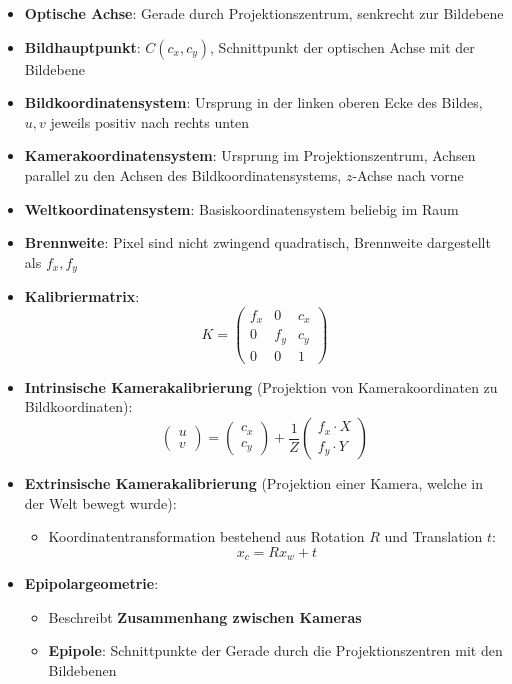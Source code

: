 \begin{itemize}
	\item \textbf{Optische Achse}: Gerade durch Projektionszentrum, senkrecht zur Bildebene
	\item \textbf{Bildhauptpunkt}: $C(c_x, c_y)$, Schnittpunkt der optischen Achse mit der Bildebene
	\item \textbf{Bildkoordinatensystem}: Ursprung in der linken oberen Ecke des Bildes, $u, v$ jeweils positiv nach rechts unten
	\item \textbf{Kamerakoordinatensystem}: Ursprung im Projektionszentrum, Achsen parallel zu den Achsen des Bildkoordinatensystems, $z$-Achse nach vorne
	\item \textbf{Weltkoordinatensystem}: Basiskoordinatensystem beliebig im Raum
	\item \textbf{Brennweite}: Pixel sind nicht zwingend quadratisch, Brennweite dargestellt als $f_x, f_y$
	\item \textbf{Kalibriermatrix}:
	$$
		K = \begin{pmatrix}
			f_x & 0 & c_x \\ 0 & f_y & c_y \\ 0 & 0 & 1
		\end{pmatrix}
	$$
	\item \textbf{Intrinsische Kamerakalibrierung} (Projektion von Kamerakoordinaten zu Bildkoordinaten):
	$$
		\begin{pmatrix}u\\v\end{pmatrix} = \begin{pmatrix}c_x\\c_y\end{pmatrix} + \frac{1}{Z}\begin{pmatrix}f_x \cdot X\\f_y \cdot Y\end{pmatrix}
	$$
	\item \textbf{Extrinsische Kamerakalibrierung} (Projektion einer Kamera, welche in der Welt bewegt wurde):
	\begin{itemize}
		\item Koordinatentransformation bestehend aus Rotation $R$ und Translation $t$:
		$$
			x_c = Rx_w + t
		$$
	\end{itemize}
	\item \textbf{Epipolargeometrie}:
	\begin{itemize}
		\item Beschreibt \textbf{Zusammenhang zwischen Kameras}
		\item \textbf{Epipole}: Schnittpunkte der Gerade durch die Projektionszentren mit den Bildebenen

\end{itemize}
\end{itemize}
